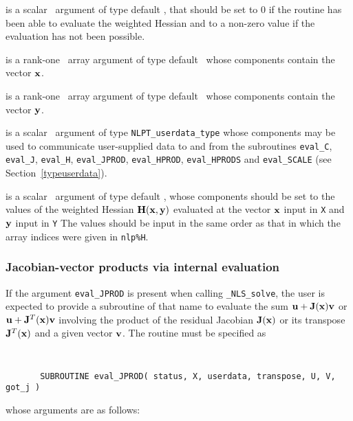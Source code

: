 \documentclass{galahad}
\newcommand{\packagename}{NLS}
\newcommand{\fullpackagename}{\libraryname\_\packagename}
\newcommand{\solver}{{\tt \fullpackagename\_solve}}
\begin{document}
\begin{description}
 is a scalar \intentout\ argument of type default \integer,
that should be set to 0 if the routine has been able to evaluate
the weighted Hessian
and to a non-zero value if the evaluation has not been possible.

 is a rank-one \intentin\ array argument of type default \realdp\
whose components contain the vector ${\mathbf{x}}$.

 is a rank-one \intentin\ array argument of type default \realdp\
whose components contain the vector ${\mathbf{y}}$.

 is a scalar \intentinout\ argument of type
{\tt NLPT\_userdata\_type} whose components may be used
to communicate user-supplied data to and from the subroutines
{\tt eval\_C}, {\tt eval\_J}, {\tt eval\_H}, {\tt eval\_JPROD},
{\tt eval\_HPROD}, {\tt eval\_HPRODS} and {\tt eval\_SCALE}
(see Section~\ref{typeuserdata}).

 is a scalar \intentout\ argument of type default \realdp,
whose components should be set to the values
of the weighted Hessian ${\mathbf{H}}({\mathbf{x}},{\mathbf{y}})$
evaluated at the vector ${\mathbf{x}}$ input in {\tt X}
and ${\mathbf{y}}$ input in {\tt Y} The values should
be input in the same order as that in which the array indices were
given in {\tt nlp\%H}.

\end{description}


\subsubsection{Jacobian-vector products via internal evaluation\label{jvfv}}

If the argument {\tt eval\_JPROD} is present when calling \solver, the
user is expected to provide a subroutine of that name to evaluate the
sum ${\mathbf{u}} + {\mathbf{J}}({\mathbf{x}}) {\mathbf{v}}$ or ${\mathbf{u}} + {\mathbf{J}}^T({\mathbf{x}}){\mathbf{v}}$ involving the
product of the residual Jacobian ${\mathbf{J}}({\mathbf{x}})$ or its transpose ${\mathbf{J}}^T({\mathbf{x}})$
and a given vector ${\mathbf{v}}$.
The routine must be specified as

\def\baselinestretch{0.8}
{\tt
\begin{verbatim}
       SUBROUTINE eval_JPROD( status, X, userdata, transpose, U, V, got_j )
\end{verbatim} }
\def\baselinestretch{1.0}
\noindent whose arguments are as follows:
\end{document}
